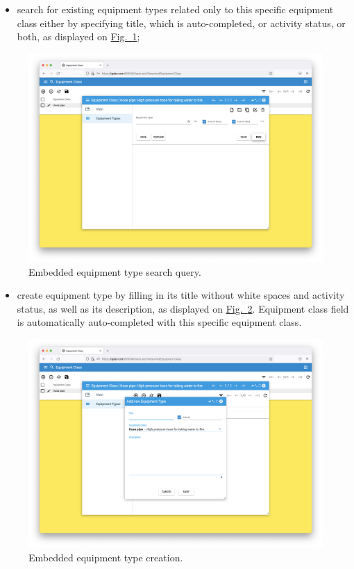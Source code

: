\newpage
\begin{itemize}
    \item search for existing equipment types related only to this specific equipment class either by specifying title, which is auto-completed, or activity status, or both, as displayed on \hyperref[sections/equipment/images/Fig.6]{Fig.~\ref*{sections/equipment/images/Fig.6}};
\end{itemize}

    \begin{figure}[!htbp]
	\centering
	\includegraphics[width=0.95\linewidth]{sections/equipment/images/Fig.6.png}
	\caption{Embedded equipment type search query.}\label{sections/equipment/images/Fig.6}
	\end{figure}
	
\newpage
\begin{itemize}
    \item create equipment type by filling in its title without white spaces and activity status, as well as its description, as displayed on \hyperref[sections/equipment/images/Fig.7]{Fig.~\ref*{sections/equipment/images/Fig.7}}. Equipment class field is automatically auto-completed with this specific equipment class.
\end{itemize}

    \begin{figure}[!htbp]
	\centering
	\includegraphics[width=0.95\linewidth]{sections/equipment/images/Fig.7.png}
	\caption{Embedded equipment type creation.}\label{sections/equipment/images/Fig.7}
	\end{figure}

